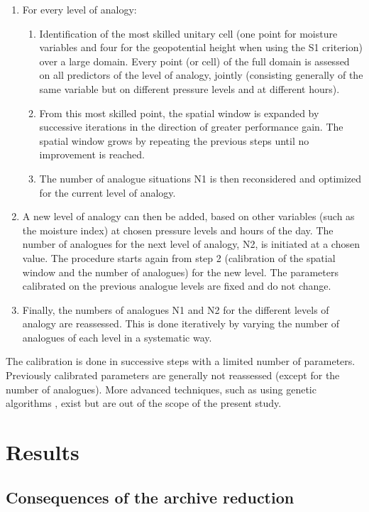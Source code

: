 \documentclass[hess, manuscript]{copernicus}
\begin{document}
\begin{enumerate}
		\item For every level of analogy:
		\begin{enumerate}
			\item Identification of the most skilled unitary cell (one point for moisture variables and four for the geopotential height when using the S1 criterion) over a large domain. Every point (or cell) of the full domain is assessed on all predictors of the level of analogy, jointly (consisting generally of the same variable but on different pressure levels and at different hours).
			\item From this most skilled point, the spatial window is expanded by successive iterations in the direction of greater performance gain. The spatial window grows by repeating the previous steps until no improvement is reached.
			\item The number of analogue situations N1 is then reconsidered and optimized for the current level of analogy.
		\end{enumerate}
		\item A new level of analogy can then be added, based on other variables (such as the moisture index) at chosen pressure levels and hours of the day. The number of analogues for the next level of analogy, N2, is initiated at a chosen value. The procedure starts again from step 2 (calibration of the spatial window and the number of analogues) for the new level. The parameters calibrated on the previous analogue levels are fixed and do not change. 
		\item Finally, the numbers of analogues N1 and N2 for the different levels of analogy are reassessed. This is done iteratively by varying the number of analogues of each level in a systematic way.
	\end{enumerate}
	
	The calibration is done in successive steps with a limited number of parameters. Previously calibrated parameters are generally not reassessed (except for the number of analogues). More advanced techniques, such as using genetic algorithms \citep{Horton2016}, exist but are out of the scope of the present study.
	
	
	\section{Results}
	\label{sec:results}
	
	\subsection{Consequences of the archive reduction}
	\label{sec:archive_reduction}
	
\end{document}
